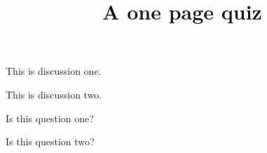 \documentclass[one page]{webquiz}
\title{A one page quiz}
\begin{document}
  \begin{discussion}[One] This is discussion one. \end{discussion}
  \begin{discussion}[Two] This is discussion two. \end{discussion}
  \begin{question} Is this question one? \end{question}
  \begin{question} Is this question two? \end{question}
\end{document}
